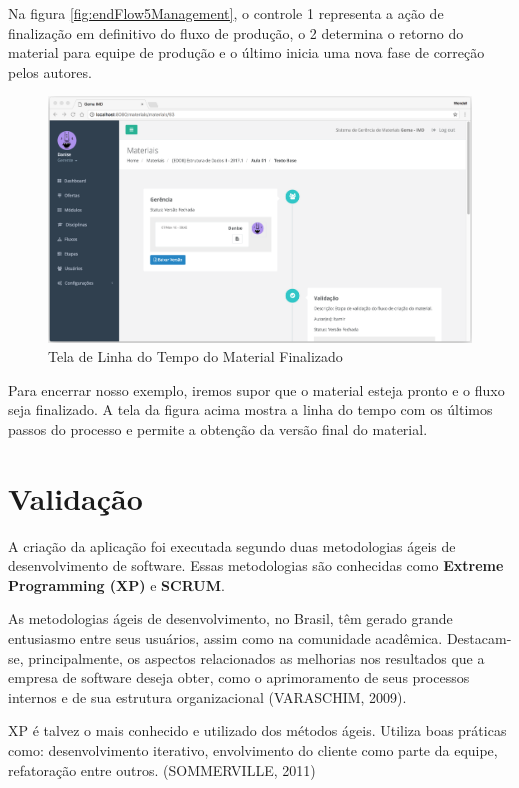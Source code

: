 Na figura \hyperref[fig:endFlow5Management]{\ref{fig:endFlow5Management}}, o controle 1 representa a ação de finalização em definitivo do fluxo de produção, o 2 determina o retorno do material para equipe de produção e o último inicia uma nova fase de correção pelos autores. 

\begin{figure}[H]
\centering
     \includegraphics[width=1.0\textwidth]{Screens/MaterialTimeline2.png}
      \caption{Tela de Linha do Tempo do Material Finalizado}
       \label{fig:materialTimeline2}
\end{figure} 

Para encerrar nosso exemplo, iremos supor que o material esteja pronto e o fluxo seja finalizado. A tela da figura acima mostra a linha do tempo com os últimos passos do processo e permite a obtenção da versão final do material.

\section{Validação}

A criação da aplicação foi executada segundo duas metodologias ágeis de desenvolvimento de software. Essas metodologias são conhecidas como \textbf{Extreme Programming (XP)} e \textbf{SCRUM}.

As metodologias ágeis de desenvolvimento, no Brasil, têm gerado grande entusiasmo entre seus usuários, assim como na comunidade acadêmica. Destacam-se, principalmente, os aspectos relacionados as melhorias nos resultados que a empresa de software deseja obter, como o aprimoramento de seus processos internos e de sua estrutura organizacional (VARASCHIM, 2009). 

XP é talvez o mais conhecido e utilizado dos métodos ágeis. Utiliza boas práticas
como: desenvolvimento iterativo, envolvimento do cliente como parte da equipe, refatoração entre outros. (SOMMERVILLE, 2011)

